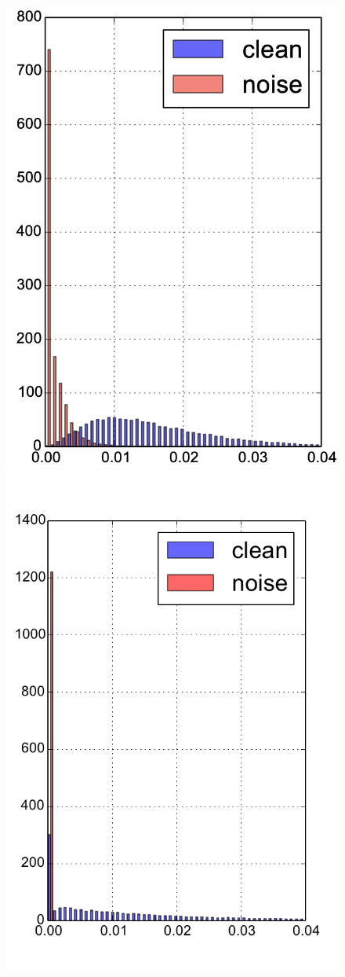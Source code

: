 \begin{figure}[t]
\includegraphics[width=3\columnwidth]{figures/condition.png}
\else
\includegraphics[width=0.45\columnwidth,trim={0cm 0 0cm 0},clip]{figures/uncondition.pdf}

\end{figure}
